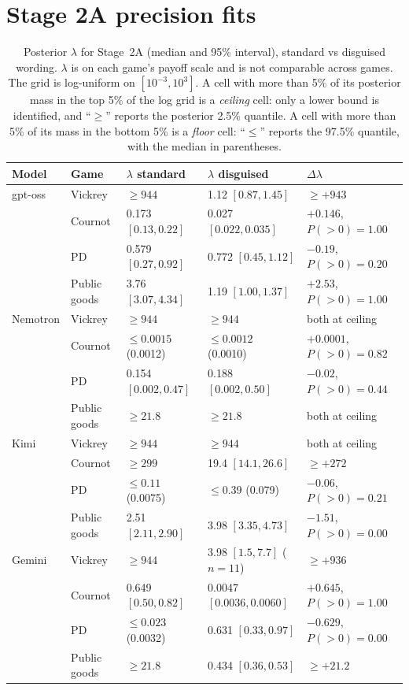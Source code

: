 \documentclass[11pt]{article}
\theoremstyle{definition}
\theoremstyle{remark}
\newcommand{\lam}{\lambda}
\begin{document}
\section{Stage 2A precision fits}\label{app:lambda}

\begin{table}[h]
\centering
\caption{Posterior $\lam$ for Stage~2A (median and 95\% interval), standard vs disguised wording.
$\lam$ is on each game's payoff scale and is not comparable across games. The grid is
log-uniform on $[10^{-3},10^{3}]$. A cell with more than 5\% of its posterior mass in the top
5\% of the log grid is a \emph{ceiling} cell: only a lower bound is identified, and ``$\ge$''
reports the posterior 2.5\% quantile. A cell with more than 5\% of its mass in the bottom 5\% is a
\emph{floor} cell: ``$\le$'' reports the 97.5\% quantile, with the median in parentheses.}
\label{tab:lambda}
\small
\begin{tabular}{@{}lllll@{}}
\toprule
Model & Game & $\lam$ standard & $\lam$ disguised & $\Delta\lam$ \\
\midrule
gpt-oss & Vickrey & $\ge944$ & 1.12 $[0.87,1.45]$ & $\ge+943$ \\
 & Cournot & 0.173 $[0.13,0.22]$ & 0.027 $[0.022,0.035]$ & $+0.146$, $P(>0)=1.00$ \\
 & PD & 0.579 $[0.27,0.92]$ & 0.772 $[0.45,1.12]$ & $-0.19$, $P(>0)=0.20$ \\
 & Public goods & 3.76 $[3.07,4.34]$ & 1.19 $[1.00,1.37]$ & $+2.53$, $P(>0)=1.00$ \\
Nemotron & Vickrey & $\ge944$ & $\ge944$ & both at ceiling \\
 & Cournot & $\le0.0015$ (0.0012) & $\le0.0012$ (0.0010) & $+0.0001$, $P(>0)=0.82$ \\
 & PD & 0.154 $[0.002,0.47]$ & 0.188 $[0.002,0.50]$ & $-0.02$, $P(>0)=0.44$ \\
 & Public goods & $\ge21.8$ & $\ge21.8$ & both at ceiling \\
Kimi & Vickrey & $\ge944$ & $\ge944$ & both at ceiling \\
 & Cournot & $\ge299$ & 19.4 $[14.1,26.6]$ & $\ge+272$ \\
 & PD & $\le0.11$ (0.0075) & $\le0.39$ (0.079) & $-0.06$, $P(>0)=0.21$ \\
 & Public goods & 2.51 $[2.11,2.90]$ & 3.98 $[3.35,4.73]$ & $-1.51$, $P(>0)=0.00$ \\
Gemini & Vickrey & $\ge944$ & 3.98 $[1.5,7.7]$ ($n=11$) & $\ge+936$ \\
 & Cournot & 0.649 $[0.50,0.82]$ & 0.0047 $[0.0036,0.0060]$ & $+0.645$, $P(>0)=1.00$ \\
 & PD & $\le0.023$ (0.0032) & 0.631 $[0.33,0.97]$ & $-0.629$, $P(>0)=0.00$ \\
 & Public goods & $\ge21.8$ & 0.434 $[0.36,0.53]$ & $\ge+21.2$ \\
\bottomrule
\end{tabular}
\end{table}
\end{document}
